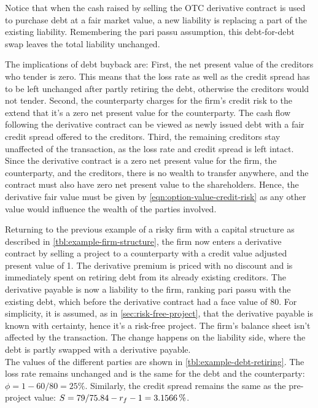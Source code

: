 \documentclass[../main.tex]{subfiles}
\begin{document}
            Notice that when the cash raised by selling the OTC derivative contract 
            is used to purchase debt at a fair market value, a new liability is replacing a part of the existing liability. 
            Remembering the pari passu assumption, this debt-for-debt swap leaves the total liability unchanged.

            The implications of debt buyback are: 
            First, the net present value of the creditors who tender is zero. 
            This means that the loss rate as well as the credit spread has to be left unchanged
            after partly retiring the debt, otherwise the creditors would not tender. 
            Second, the counterparty charges for the firm's credit risk 
            to the extend that it's a zero net present value for the counterparty. 
            The cash flow following the derivative contract can be viewed as newly issued debt
            with a fair credit spread offered to the creditors.
            Third, the remaining creditors stay unaffected of the transaction, 
            as the loss rate and credit spread is left intact. 
            Since the derivative contract is a zero net present value for the firm, 
            the counterparty, and the creditors, there is no wealth to transfer anywhere,
            and the contract must also have zero net present value to the shareholders. 
            Hence, the derivative fair value must be given by \cref{eqn:option-value-credit-risk} 
            as any other value would influence the wealth of the parties involved.

            Returning to the previous example of a risky firm with a capital structure
            as described in \cref{tbl:example-firm-structure}, 
            the firm now enters a derivative contract by selling a project to a counterparty
            with a credit value adjusted present value of 1. 
            The derivative premium is priced with no discount 
            and is immediately spent on retiring debt from its already existing creditors. 
            The derivative payable is now a liability to the firm, ranking pari passu with the existing debt, 
            which before the derivative contract had a face value of 80. 
            For simplicity, it is assumed, as in \cref{sec:risk-free-project},
            that the derivative payable is known with certainty, hence it's a risk-free project. 
            The firm's balance sheet isn't affected by the transaction. 
            The change happens on the liability side, where the debt is partly swapped with a derivative payable.\\
            The values of the different parties are shown in \cref{tbl:example-debt-retiring}. 
            The loss rate remains unchanged and is the same for the debt and the counterparty: $\phi=1-60/80=25\%$. 
            Similarly, the credit spread remains the same as the pre-project value: $S=79/\num{75.84}-r_{f}-1=\pct{0.031566}$.
            
\end{document}
